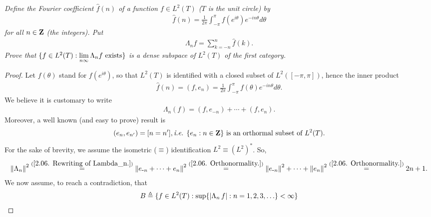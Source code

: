 \textit{
Define the Fourier coefficient $\hat{f}(n)$ of a function %
%
  $f\in L^2(T)$ ($T$ is the unit circle) %
%
by
%
  \begin{align*}
  \hat{f}(n) 
    = 
  \frac{1}{2\pi} \int_{\minus \pi}^{\pi} %
    f(e^{i\theta}) e^{\minus i n\theta} d\theta
  \end{align*}
%
for all $n\in {\mathbf Z}$ (the integers). Put 
%
  \begin{align*}
    \Lambda_n f =\sum_{k=\minus n }^{n} \hat{f}(k).
  \end{align*}
%
Prove that %
  $\{f \in {L}^2(T): \underset{n\infty}{\lim}\,\Lambda_n f \text{ exists}\} $ %
%
is a dense subspace of $L^2(T)$ of the first category. %
}
%
\begin{proof}%
Let $f(\theta)$ stand for $f(e^{i\theta})$, so that %
%
  $L^2(T)$ is identified with a closed subset of $L^2([\minus \pi, \pi])$, %
%
hence the inner product %
%
  \begin{align}\label{2.06. Inner product.}
    \hat{f}(n) 
      = 
    (f,e_n) 
      =
    \frac{1}{2\pi} \int_{\minus \pi}^\pi f(\theta)e^{\minus in\theta}d\theta.
  \end{align}
%
We believe it is customary to write %
\begin{align}\label{2.06. Rewriting of Lambda_n.}
  \Lambda_n (f) = (f, e_{\minus n}) + \cdots + (f, e_n).
\end{align}
Moreover, a well known (and easy to prove) result is %
%
  \begin{align}\label{2.06. Orthonormality.}
    (e_{n}, e_{n'}) = [n=n'], \text{\ie } %
    \set{e_n}{n\in\Z} \text{ is an orthormal subset of } L^2(T).
  \end{align}
%
For the sake of brevity, we assume the isometric ($\equiv$) %
identification %
%
  $L^2\equiv (L^2)^\ast$. %
%
So,  %
%
  \begin{align}\label{2.06. Norm of Lambda_n.}
    \norm{\Lambda_n}^2
      \overset{(\ref{2.06. Rewriting of Lambda_n.})}{=}
    \norm{e_{\text{\small{-}} n}  + \cdots + e_n}^2 
      \overset{(\ref{2.06. Orthonormality.})}{=} 
    \norm{e_{\text{\small{-}} n }}^2 + \cdots + \norm{e_{n}}^2
      \overset{(\ref{2.06. Orthonormality.})}{=}
    2n+1.
  \end{align}
%
We now assume, to reach a contradiction, that %
%
  \begin{align}
    B \Def \set{f \in {L}^2(T)}{
      \sup\set{
        \magnitude{\Lambda_n \,f}}{
        \counting{n}
      } < \infty
}
\end{align}
\end{proof}
